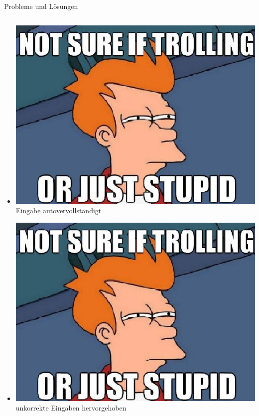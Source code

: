 \documentclass{beamer} %
\begin{document}
\begin{frame}{Probleme und Lösungen}
\begin{columns}[c]
\begin{column}{0.5\textwidth}
\begin{itemize}
					\item \includegraphics[height=\baselineskip]{uebung10_Soloninov_Dorkenwald} Eingabe autovervollständigt
						\pause
					\item \includegraphics[height=\baselineskip]{uebung10_Soloninov_Dorkenwald} unkorrekte Eingaben hervorgehoben
				\end{itemize}
			\end{column}
		\end{columns}
	\end{frame}
\end{document}
